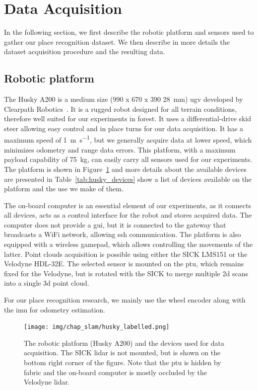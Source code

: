 \section{Data Acquisition}
\label{sec:chap_slam_data_acquisition}

In the following section, we first describe the robotic platform and sensors used to gather our place recognition dataset. We then describe in more details the dataset acquisition procedure and the resulting data.


\subsection{Robotic platform}
\label{ssec:chap_slam_platform}

The Husky A200 is a medium size (990 x 670 x 390 \SI{28}{\milli\meter}) \gls{ugv} developed by Clearpath Robotics~\cite{ClearpathWeb}. It is a rugged robot designed for all terrain conditions, therefore well suited for our experiments in forest. It uses a differential-drive skid steer allowing easy control and in place turns for our data acquisition. It has a maximum speed of \SI{1}{\meter\per\second}, but we generally acquire data at lower speed, which minimizes odometry and range data errors. This platform, with a maximum payload capability of \SI{75}{\kilo\gram}, can easily carry all sensors used for our experiments. The platform is shown in Figure~\ref{fig:chap_slam_husky} and more details about the available devices are presented in Table~\ref{tab:husky_devices} show a list of devices available on the platform and the use we make of them.

The on-board computer is an essential element of our experiments, as it connects all devices, acts as a control interface for the robot and stores acquired data. The computer does not provide a \gls{gui}, but it is connected to the gateway that broadcasts a WiFi network, allowing \gls{ssh} communication. The platform is also equipped with a wireless gamepad, which allows controlling the movements of the latter. Point clouds acquisition is possible using either the SICK LMS151 or the Velodyne HDL-32E. The selected sensor is mounted on the \gls{ptu}, which remains fixed for the Velodyne, but is rotated with the SICK to merge multiple \gls{2d} scans into a single \gls{3d} point cloud.

For our place recognition research, we mainly use the wheel encoder along with the \gls{imu} for odometry estimation. 

\begin{figure}
    \centering
    \texttt{[image: img/chap\_slam/husky\_labelled.png]}
    \caption{The robotic platform (Husky A200) and the devices used for data acquisition. The SICK \gls{lidar} is not mounted, but is shown on the bottom right corner of the figure. Note that the \gls{ptu} is hidden by fabric and the on-board computer is mostly occluded by the Velodyne \gls{lidar}.}
    \label{fig:chap_slam_husky}
\end{figure}

